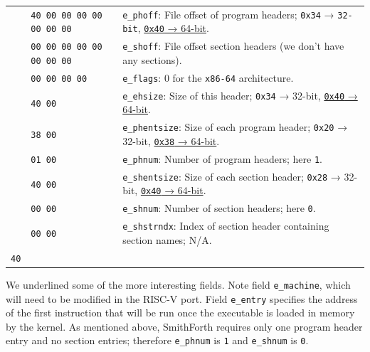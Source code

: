 \documentclass[a4paper,12pt,final]{article}
\begin{document}
\begin{table}[!htbp]
\begin{adjustwidth}{-1cm}{-1cm}
\begin{center}
\begin{tabular}{l|l|l}
 & \hspace{0.000000em}​\texttt{40 00 00 00 00 00 00 00} & \texttt{e\_phoff}: File offset of program headers; \texttt{0x34} → \texttt{32-bit}, \uline{\texttt{0x40} → 64-bit}.\\[0pt]
 & \hspace{0.000000em}​\texttt{00 00 00 00 00 00 00 00} & \texttt{e\_shoff}: File offset section headers (we don't have any sections).\\[0pt]
\hline
 & \hspace{0.000000em}​\texttt{00 00 00 00} & \texttt{e\_flags}: 0 for the \texttt{x86-64} architecture.\\[0pt]
 & \hspace{6.318000em}​\texttt{40 00} & \texttt{e\_ehsize}: Size of this header; \texttt{0x34} → 32-bit, \uline{\texttt{0x40} → 64-bit}.\\[0pt]
 & \hspace{9.477000em}​\texttt{38 00} & \texttt{e\_phentsize}: Size of each program header; \texttt{0x20} → 32-bit, \uline{\texttt{0x38} → 64-bit}.\\[0pt]
 & \hspace{0.000000em}​\texttt{01 00} & \texttt{e\_phnum}: Number of program headers; here \texttt{1}.\\[0pt]
 & \hspace{3.159000em}​\texttt{40 00} & \texttt{e\_shentsize}: Size of each section header; \texttt{0x28} → 32-bit, \uline{\texttt{0x40} → 64-bit}.\\[0pt]
 & \hspace{6.318000em}​\texttt{00 00} & \texttt{e\_shnum}: Number of section headers; here \texttt{0}.\\[0pt]
 & \hspace{9.477000em}​\texttt{00 00} & \texttt{e\_shstrndx}: Index of section header containing section names; N/A.\\[0pt]
\hline
\texttt{40} &  & \\[0pt]
\end{tabular}

\end{center}
\normalsize \end{adjustwidth} \end{table} \vspace{0}

We underlined some of the more interesting fields.  Note field
\texttt{e\_machine}, which will need to be modified in the RISC-V port.  Field
\texttt{e\_entry} specifies the address of the first instruction that will be
run once the executable is loaded in memory by the kernel.  As
mentioned above, SmithForth requires only one program header entry and
no section entries; therefore \texttt{e\_phnum} is \texttt{1} and \texttt{e\_shnum} is \texttt{0}.
\end{document}
